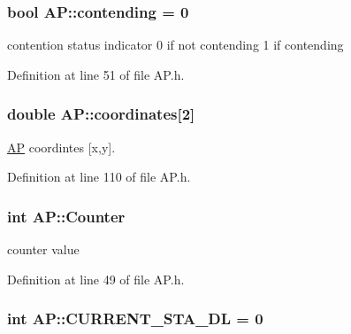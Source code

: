 \hypertarget{classAP_afe722094c1dea7972332a788411cc488}{
\subsubsection[{contending}]{\setlength{\rightskip}{0pt plus 5cm}bool A\-P\-::contending = 0\hspace{0.3cm}{\ttfamily [private]}}}\label{classAP_afe722094c1dea7972332a788411cc488}


contention status indicator 0 if not contending 1 if contending 



Definition at line 51 of file A\-P.\-h.

\hypertarget{classAP_ac52816d18c4dc26158fa3bd2e63f3bcc}{
\subsubsection[{coordinates}]{\setlength{\rightskip}{0pt plus 5cm}double A\-P\-::coordinates\mbox{[}2\mbox{]}}}\label{classAP_ac52816d18c4dc26158fa3bd2e63f3bcc}


\hyperlink{classAP}{A\-P} coordintes \mbox{[}x,y\mbox{]}. 



Definition at line 110 of file A\-P.\-h.

\hypertarget{classAP_a4cf433d4becdf9cb836d170133d9d478}{
\subsubsection[{Counter}]{\setlength{\rightskip}{0pt plus 5cm}int A\-P\-::\-Counter\hspace{0.3cm}{\ttfamily [private]}}}\label{classAP_a4cf433d4becdf9cb836d170133d9d478}


counter value 



Definition at line 49 of file A\-P.\-h.

\hypertarget{classAP_aabddb8414a6a9ecdd51e7e2a03310eb9}{
\subsubsection[{C\-U\-R\-R\-E\-N\-T\-\_\-\-S\-T\-A\-\_\-\-D\-L}]{\setlength{\rightskip}{0pt plus 5cm}int A\-P\-::\-C\-U\-R\-R\-E\-N\-T\-\_\-\-S\-T\-A\-\_\-\-D\-L = 0}}\label{classAP_aabddb8414a6a9ecdd51e7e2a03310eb9}


